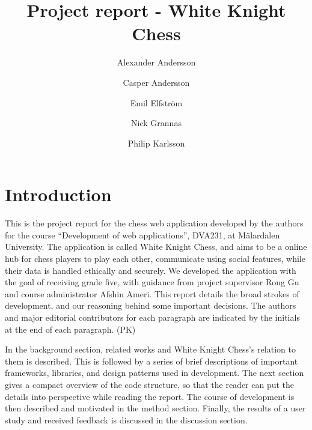 \documentclass[acmlarge, review=false, screen=true]{acmart}
\begin{document}
\title{Project report - White Knight Chess}

\author{Alexander Andersson}
\author{Casper Andersson}
\author{Emil Elfström}
\author{Nick Grannas}
\author{Philip Karlsson}




\maketitle

\section{Introduction}
This is the project report for the chess web application developed by the authors for the course “Development of web applications”, DVA231, at Mälardalen University. The application is called White Knight Chess, and aims to be a online hub for chess players to play each other, communicate using social features, while their data is handled ethically and securely. We developed the application with the goal of receiving grade five, with guidance from project supervisor Rong Gu and course administrator Afshin Ameri. This report details the broad strokes of development, and our reasoning behind some important decisions. The authors and major editorial contributors for each paragraph are indicated by the initials at the end of each paragraph. (PK)

In the background section, related works and White Knight Chess's relation to them is described. This is followed by a series of brief descriptions of important frameworks, libraries, and design patterns used in development. The next section gives a compact overview of the code structure, so that the reader can put the details into perspective while reading the report. The course of development is then described and motivated in the method section. Finally, the results of a user study and received feedback is discussed in the discussion section.
\end{document}
